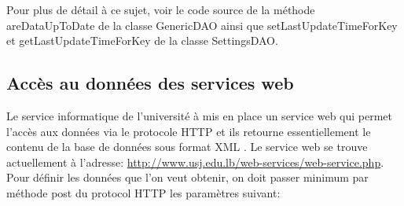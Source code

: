 		Pour plus de détail à ce sujet, voir le code source de la  méthode areDataUpToDate de la classe GenericDAO ainsi que setLastUpdateTimeForKey et getLastUpdateTimeForKey de la classe  SettingsDAO.
		
	\subsection{Accès au données des services web}
	Le service informatique de l'université à mis en place un service web qui permet l'accès aux données  via le protocole HTTP et ils retourne essentiellement le contenu de la base de données sous format XML . Le service web se trouve actuellement à l'adresse: \url{http://www.usj.edu.lb/web-services/web-service.php}. Pour définir les données que l'on veut obtenir, on doit passer minimum par méthode post du protocol HTTP les paramètres suivant:
